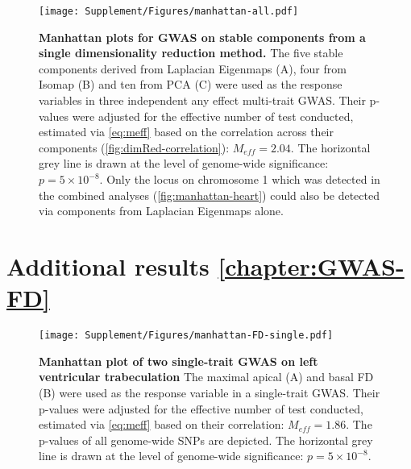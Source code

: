 \begin{figure}[hbtp]
	\centering
	\texttt{[image: Supplement/Figures/manhattan-all.pdf]}
	\caption[\textbf{Manhattan plots for GWAS on stable components from a single dimensionality reduction method. }]{\textbf{Manhattan plots for GWAS on stable components from a single dimensionality reduction method. }The five stable components derived from Laplacian Eigenmaps (A), four from Isomap (B) and ten from PCA (C) were used as the response variables in three independent any effect multi-trait GWAS. Their p-values were adjusted for the effective number of test conducted, estimated via \cref{eq:meff} based on the correlation across their components (\cref{fig:dimRed-correlation}): \(M_{eff}=2.04\). The horizontal grey line is drawn at the level of genome-wide significance: \(p = 5 \times 10^{-8}\). Only the locus on chromosome 1 which was detected in the combined analyses (\cref{fig:manhattan-heart}) could also be detected via components from Laplacian Eigenmaps alone. } 
	 	\label{fig:manhattan-3Dheart-single}
\end{figure}

\newpage
\section{Additional results \cref{chapter:GWAS-FD}}
\begin{figure}[hbtp]
	\centering
	\texttt{[image: Supplement/Figures/manhattan-FD-single.pdf]}
	\caption[\textbf{Manhattan plot of  two single-trait GWAS on left ventricular trabeculation. }]{\textbf{Manhattan plot of two single-trait GWAS on left ventricular trabeculation } The maximal apical (A) and basal FD (B) were used as the response variable in a single-trait GWAS.  Their p-values were adjusted for the effective number of test conducted, estimated via \cref{eq:meff} based on their correlation: \(M_{eff}=1.86\). The p-values of all genome-wide SNPs are depicted. The horizontal grey line is drawn at the level of genome-wide significance: \(p = 5 \times 10^{-8}\).} 
	 	\label{fig:manhattan-FD-single}
\end{figure}



